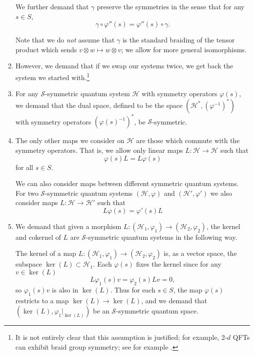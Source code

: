 \documentclass[a4paper,10pt]{scrreprt}
\theoremstyle{definition}
\theoremstyle{plain}
\theoremstyle{remark}
\begin{document}
\begin{enumerate}[label=\Roman*.]
    We further demand that $\gamma$ preserve the symmetries in the sense that for any $s \in S$,
    \begin{equation*}
      \gamma \circ \varphi''(s) = \varphi''(s) \circ \gamma.
    \end{equation*}

    Note that we do \emph{not} assume that $\gamma$ is the standard braiding of the tensor product which sends $v \otimes w \mapsto w \otimes v$; we allow for more general isomorphisms.

  \item However, we demand that if we swap our systems twice, we get back the system we started with.\footnote{It is not entirely clear that this assumption is justified; for example, 2-$d$ QFTs can exhibit braid group symmetry; see for example \cite{braidstatisticsinlocalqft}.}

  \item For any $\mathcal{S}$-symmetric quantum system $\mathscr{H}$ with symmetry operators $\varphi(s)$, we demand that the dual space, defined to be the space $(\mathscr{H}^{*}, \left( \varphi^{-1} \right)^{*})$ with symmetry operators $\left( \varphi(s)^{-1} \right)^{*}$, be $\mathcal{S}$-symmetric.

  \item The only other maps we consider on $\mathscr{H}$ are those which commute with the symmetry operators. That is, we allow only linear maps $L\colon \mathscr{H} \to \mathscr{H}$ such that 
    \begin{equation*}
      \varphi(s)L = L \varphi(s)
    \end{equation*}
    for all $s \in S$. 

    We can also consider maps between different symmetric quantum systems. For two $\mathcal{S}$-symmetric quantum systems $(\mathscr{H}, \varphi)$ and $(\mathscr{H}', \varphi')$ we also consider maps $L\colon \mathscr{H} \to \mathscr{H}'$ such that
    \begin{equation*}
      L \varphi(s) = \varphi'(s) L
    \end{equation*}

  \item We demand that given a morphism $L\colon (\mathscr{H}_{1}, \varphi_{1}) \to (\mathscr{H}_{2}, \varphi_{2})$, the kernel and cokernel of $L$ are $\mathcal{S}$-symmetric quantum systems in the following way.

    The kernel of a map $L\colon (\mathscr{H}_{1}, \varphi_{1}) \to (\mathscr{H}_{2}, \varphi_{2})$ is, as a vector space, the subspace $\ker(L) \subset\mathscr{H}_{1}$. Each $\varphi(s)$ fixes the kernel since for any $v \in \ker(L)$
    \begin{equation*}
      L \varphi_{1}(s) v = \varphi_{2}(s) L v = 0,
    \end{equation*}
    so $\varphi_{1}(s) v$ is also in $\ker(L)$. Thus for each $s \in S$, the map $\varphi(s)$ restricts to a map $\ker(L) \to \ker(L)$, and we demand that $(\ker(L), \varphi_{1}|_{\ker(L)})$ be an $\mathcal{S}$-symmetric quantum space.


\end{enumerate}
\end{document}
